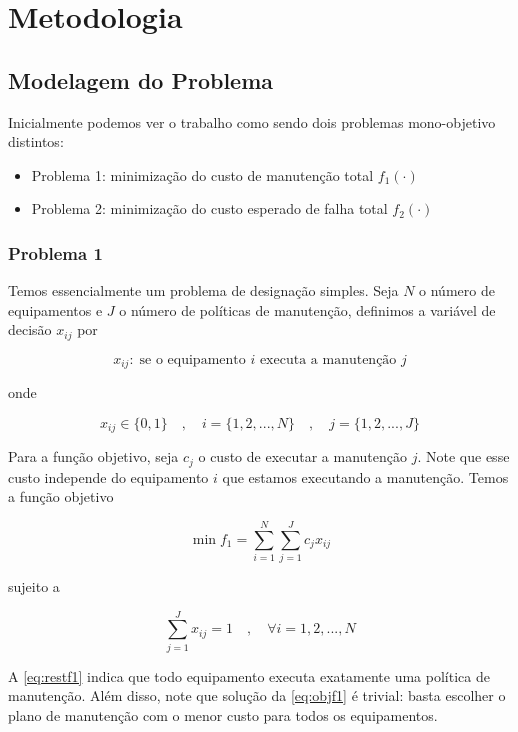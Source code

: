 \documentclass[conference]{IEEEtran}
\newcommand{\un}[1]{\;\text{#1}}
\begin{document}
\section{Metodologia}


\subsection{Modelagem do Problema}
Inicialmente podemos ver o trabalho como sendo dois problemas mono-objetivo distintos:

\begin{itemize}
	\item Problema 1: minimização do custo de manutenção total $f_1 (\cdot)$
	\item Problema 2: minimização do custo esperado de falha total $f_2 (\cdot)$
\end{itemize}

\subsubsection{Problema 1}

Temos essencialmente um problema de designação simples. Seja $N$ o número de 
equipamentos e $J$ o número de políticas de manutenção, definimos a variável de decisão $x_{ij}$ 
por

\begin{equation}
	x_{ij}: \un{se o equipamento $i$ executa a manutenção $j$}
\end{equation}

\noindent onde 

\[ x_{ij} \in \{0,1\} \quad , \quad i = \{1, 2, ..., N\}  \quad , \quad j = \{1, 2, ..., J\} \]

Para a função objetivo, seja $c_j$ o custo de executar a manutenção $j$. Note que esse custo 
independe do equipamento $i$ que estamos executando a manutenção. Temos a função objetivo  

\begin{equation}\label{eq:objf1}
	\min f_1 = \sum_{i=1}^{N} \sum_{j=1}^{J} c_j x_{ij}
\end{equation}

\noindent sujeito a 

\begin{equation}\label{eq:restf1}
	\sum_{j=1}^{J} x_{ij} = 1 \quad , \quad \forall i = {1, 2, ..., N}
\end{equation}

A \ref{eq:restf1} indica que todo equipamento executa exatamente uma política de manutenção.
Além disso, note que solução da \ref{eq:objf1} é trivial: basta escolher o plano de 
manutenção com o menor custo para todos os equipamentos.
\end{document}
